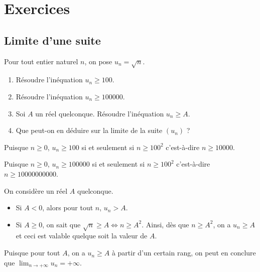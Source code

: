 \documentclass[11pt,fleqn]{book} %
\begin{document}

\chapter{Exercices}
\setcounter{section}{0}

\section*{Limite d'une suite}

\begin{exercise} Pour tout entier naturel $n$, on pose $u_n=\sqrt{n}$.
\begin{enumerate}
\item Résoudre l'inéquation $u_n \geqslant 100$.
\item Résoudre l'inéquation $u_n \geqslant 100000$.
\item Soi $A$ un réel quelconque. Résoudre l'inéquation $u_n \geqslant A$.
\item Que peut-on en déduire sur la limite de la suite $(u_n)$ ?
\end{enumerate}
\end{exercise}
\begin{solution}Puisque $n \geqslant 0$, $u_n \geqslant 100$ si et seulement si $n \geqslant 100^2$ c'est-à-dire $n \geqslant 10000$.

Puisque $n \geqslant 0$, $u_n \geqslant 100000$ si et seulement si $n \geqslant 100^2$ c'est-à-dire $n \geqslant 10000000000$.

On considère un réel $A$ quelconque.
\begin{itemize}
\item Si $A<0$, alors pour tout $n$, $u_n>A$.
\item Si $A\geqslant 0$, on sait que $\sqrt{n} \geqslant A \Leftrightarrow n \geqslant A^2$. Ainsi, dès que $n\geqslant A^2$, on a $u_n \geqslant A$ et ceci est valable quelque soit la valeur de $A$.
\end{itemize}

Puisque pour tout $A$, on a $u_n \geqslant A$ à partir d'un certain rang, on peut en conclure que $\displaystyle \lim _{n\to +\infty} u_n = +\infty$.\end{solution}
\end{document}
